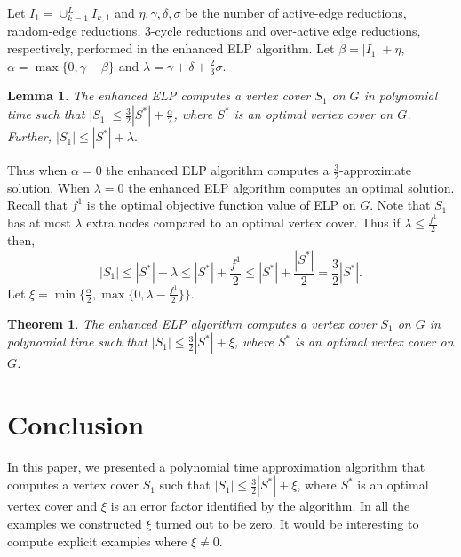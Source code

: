 \documentclass[12pt]{article}
\newtheorem{theorem}{Theorem}
\newtheorem{lemma}{Lemma}
\begin{document}
Let $I_1=\cup_{k=1}^L I_{k,1}$ and $\eta, \gamma, \delta, \sigma$ be the
number of active-edge reductions, random-edge reductions, 3-cycle reductions and over-active edge reductions,
 respectively,  performed in the enhanced ELP
 algorithm. Let $\beta=|I_1|+\eta$, $\alpha = \max\{0,
\gamma - \beta\}$ and $\lambda = \gamma+\delta+\frac{2}{3}\sigma$.

\begin{lemma} The enhanced ELP computes a vertex cover $S_1$ on $G$ in
polynomial time such that $|S_1|\leq \frac{3}{2}|S^*|+\frac{\alpha}{2}$, where
$S^*$ is an optimal vertex cover on $G$. Further, $|S_1|\leq
|S^*|+\lambda.$\end{lemma}

Thus when $\alpha = 0$ the enhanced ELP algorithm computes a
$\frac{3}{2}$-approximate solution. When $\lambda = 0$ the
enhanced ELP algorithm computes an optimal solution. Recall that
$f^1$ is the optimal objective function value of ELP on $G$. Note
that $S_1$ has at most $\lambda$ extra nodes compared to an
optimal vertex cover. Thus if $\lambda \leq \frac{f^1}{2}$ then,
$$ |S_1|\leq |S^*|+\lambda \leq |S^*|+ \frac{f^1}{2} \leq
|S^*|+\frac{|S^*|}{2}=\frac{3}{2}|S^*|.
$$
 Let $\xi =
 \min\{\frac{\alpha}{2}, \max\{0, \lambda-\frac{f^1}{2}\}\}$.

 \begin{theorem} The enhanced ELP algorithm computes a vertex cover $S_1$ on $G$ in
polynomial time such that $|S_1|\leq \frac{3}{2}|S^*|+\xi$, where $S^*$
is an optimal vertex cover on $G$.\end{theorem}


\section{Conclusion} In this paper, we presented a polynomial time
approximation algorithm that computes a vertex cover $S_1$ such that
$|S_1|\leq \frac{3}{2}|S^*|+\xi$, where $S^*$ is an optimal vertex
cover and $\xi$ is an error factor identified by the algorithm. In
all the examples we constructed $\xi$ turned out to be zero.
It would be interesting
to compute explicit examples where $\xi\ne 0$.

\vskip 5pt
\end{document}
